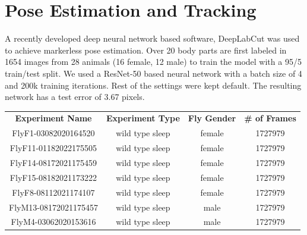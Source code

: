 \section{Pose Estimation and Tracking}
A recently developed deep neural network based software, DeepLabCut was used to achieve markerless pose estimation.
Over 20 body parts are first labeled in 1654 images from 28 animals (16 female, 12 male) to train the model with a 95/5 train/test split.
We used a ResNet-50 based neural network with a batch size of 4 and 200k training iterations.
Rest of the settings were kept default.
The resulting network has a test error of 3.67 pixels.

\begin{table}[htb!]
	\begin{adjustbox}{width=1\textwidth}
		\begin{tabular}{c c c c}
			\toprule
			\multicolumn{1}{c}{\textbf{Experiment Name}} & \multicolumn{1}{c}{\textbf{Experiment Type}} & \multicolumn{1}{c}{\textbf{Fly Gender}} & \multicolumn{1}{c}{\textbf{\# of Frames}} \\
			\cmidrule(lr){1-1}\cmidrule(lr){2-2}\cmidrule(lr){3-3}\cmidrule(lr){4-4}
			FlyF1-03082020164520                         & wild type sleep                              & female                                  & 1727979                                   \\
			FlyF11-01182022175505                        & wild type sleep                              & female                                  & 1727979                                   \\
			FlyF14-08172021175459                        & wild type sleep                              & female                                  & 1727979                                   \\
			FlyF15-08182021173222                        & wild type sleep                              & female                                  & 1727979                                   \\
			FlyF8-08112021174107                         & wild type sleep                              & female                                  & 1727979                                   \\
			FlyM13-08172021175457                        & wild type sleep                              & male                                    & 1727979                                   \\
			FlyM4-03062020153616                         & wild type sleep                              & male                                    & 1727979                                   \\

\end{tabular}
\end{adjustbox}
\end{table}
